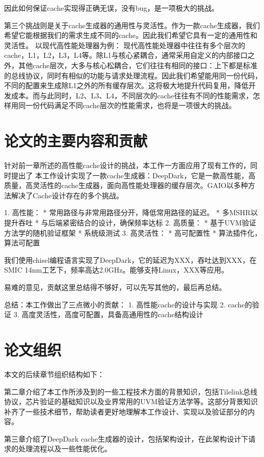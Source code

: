 因此如何保证cache实现得正确无误，没有bug，是一项极大的挑战。

第三个挑战则是关于cache生成器的通用性与灵活性。作为一款cache生成器，我们希望它能根据我们的需求生成不同的cache。因此我们希望它具有一定的通用性和灵活性。
以现代高性能处理器为例： 现代高性能处理器中往往有多个层次的cache，L1，L2，L3，L4等。除L1与核心紧耦合，通常采用自定义的内部接口之外，其他cache层次，大多与核心松耦合，它们往往有相同的接口：上下都是标准的总线协议，同时有相似的功能与请求处理流程。因此我们希望能用同一份代码，不同的配置来生成除L1之外的所有缓存层次。这将极大地提升代码复用，降低开发成本。而与此同时，L2、L3、L4，不同层次的cache往往有不同的性能需求，怎样用同一份代码满足不同cache层次的性能需求，也将是一项很大的挑战。

\section{论文的主要内容和贡献}

针对前一章所述的高性能cache设计的挑战，本工作一方面应用了现有工作的，同时提出了
本工作设计实现了一款cache生成器：DeepDark，它是一款高性能，高质量，高灵活性的cache生成器，面向高性能处理器的缓存层次。GAIO以多种方法解决了Cache设计存在的多个挑战。

1. 高性能：
  * 常用路径与非常用路径分开，降低常用路径的延迟。
  * 多MSHR以提升吞吐
  * 与后端紧密结合的设计，确保频率达标
2. 高质量：
  * 基于UVM验证方法学的随机验证框架
  * 系统级测试
3. 高灵活性：
  * 高可配置性
  * 算法插件化，算法可配置

  我们使用chisel编程语言实现了DeepDark，它的延迟为XXX，吞吐达到XXX，在SMIC 14nm工艺下，频率高达2.0GHz。能够支持Linux，XXX等应用。

  易难的意见，贡献这里总结得不够好，可以先写其他的，最后再总结。

总结：本工作做出了三点微小的贡献：
1. 高性能cache的设计与实现
2. cache的验证
3. 高度灵活性，高度可配置，具备高通用性的cache结构设计

\section{论文组织}

本文的后续章节组织结构如下：

第二章介绍了本工作所涉及到的一些工程技术方面的背景知识，包括Tilelink总线协议，芯片验证的基础知识以及业界常用的UVM验证方法学等。这部分背景知识补齐了一些技术细节，帮助读者更好地理解本工作设计、实现以及验证部分的内容。

第三章介绍了DeepDark cache生成器的设计，包括架构设计，在此架构设计下请求的处理流程以及一些性能优化。

